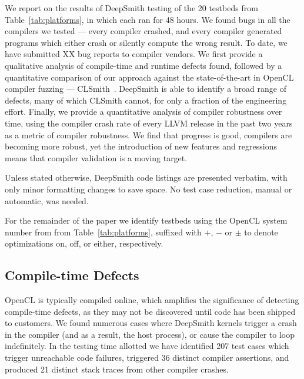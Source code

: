 We report on the results of DeepSmith testing of the 20 testbeds from Table~\ref{tab:platforms}, in which each ran for 48 hours.
We found bugs in all the compilers we tested --- every compiler crashed, and every compiler generated programs which either crash or silently compute the wrong result. To date, we have submitted XX bug reports to compiler vendors. We first provide a qualitative analysis of compile-time and runtime defects found, followed by a quantitative comparison of our approach against the state-of-the-art in OpenCL compiler fuzzing --- CLSmith~\cite{Lidbury2015a}. DeepSmith is able to identify a broad range of defects, many of which CLSmith cannot, for only a fraction of the engineering effort. Finally, we provide a quantitative analysis of compiler robustness over time, using the compiler crash rate of every LLVM release in the past two years as a metric of compiler robustness. We find that progress is good, compilers are becoming more robust, yet the introduction of new features and regressions means that compiler validation is a moving target.


Unless stated otherwise, DeepSmith code listings are presented verbatim, with only minor formatting changes to save space. No test case reduction, manual or automatic, was needed.


For the remainder of the paper we identify testbeds using the OpenCL system number from from Table~\ref{tab:platforms}, suffixed with $+$, $-$ or $\pm$ to denote optimizations on, off, or either, respectively.

\subsection{Compile-time Defects}%
\label{subsec:compile-time-defects}

OpenCL is typically compiled online, which amplifies the significance of detecting compile-time defects, as they may not be discovered until code has been shipped to customers. We found numerous cases where DeepSmith kernels trigger a crash in the compiler (and as a result, the host process), or cause the compiler to loop indefinitely. In the testing time allotted we have identified 207 test cases which trigger unreachable code failures, triggered 36 distinct compiler assertions, and produced 21 distinct stack traces from other compiler crashes.

